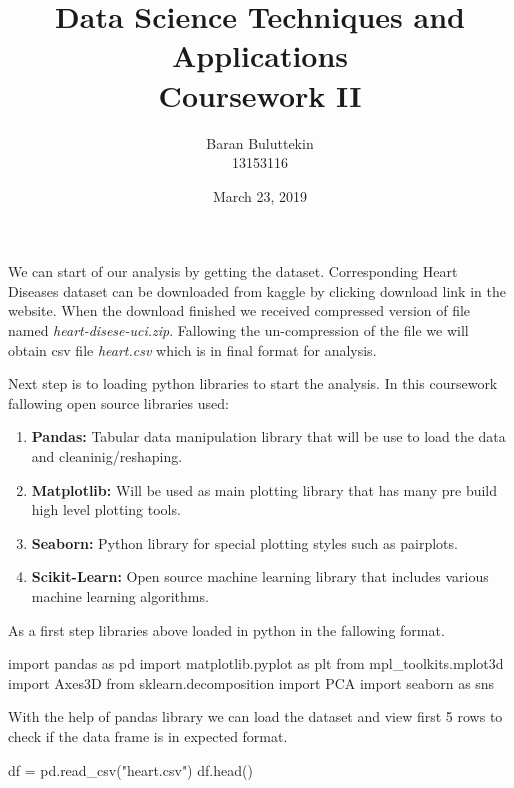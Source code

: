 \documentclass[12pt]{article}
\begin{document}
\author{Baran Buluttekin\\13153116}
\title{Data Science Techniques and Applications\\Coursework II}
\date{March 23, 2019}
\maketitle

\medskip

\indent We can start of our analysis by getting the dataset. Corresponding Heart Diseases dataset\cite{kaggle}\cite{uci-source} can be downloaded from kaggle by clicking download link in the website. When the download finished we received compressed version of file named \textit{heart-disese-uci.zip}. Fallowing the un-compression of the file we will obtain csv file \textit{heart.csv} which is in final format for analysis. 

Next step is to loading python libraries to start the analysis. In this coursework fallowing open source libraries used:
\begin{enumerate}
    \item \textbf{Pandas: }Tabular data manipulation library that will be use to load the data and cleaninig/reshaping.\cite{mckinney-proc-scipy-2010}
    \item \textbf{Matplotlib: }Will be used as main plotting library that has many pre build high level plotting tools.\cite{matplotlib}
    \item \textbf{Seaborn: }Python library for special plotting styles such as pairplots.\cite{seaborn}
    \item \textbf{Scikit-Learn: }Open source machine learning library that includes various machine learning algorithms.\cite{scikit-learn}
\end{enumerate}

As a first step libraries above loaded in python in the fallowing format.

\begin{python}
    import pandas as pd
    import matplotlib.pyplot as plt
    from mpl_toolkits.mplot3d import Axes3D
    from sklearn.decomposition import PCA
    import seaborn as sns
\end{python}

With the help of pandas library we can load the dataset and view first 5 rows to check if the data frame is in expected format.

\begin{python}
    df = pd.read_csv("heart.csv")
    df.head()
\end{python}
\end{document}
